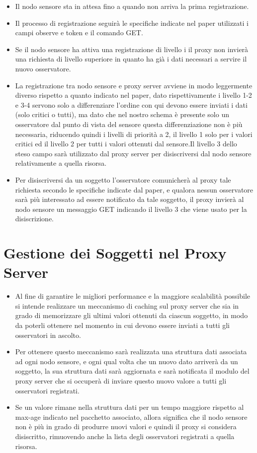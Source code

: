     \begin{itemize}
      \item Il nodo sensore sta in attesa fino a quando non arriva la prima registrazione.
      \item Il processo di registrazione seguirà le specifiche indicate nel paper utilizzati i campi observe e token e il comando GET.
      \item Se il nodo sensore ha attiva una registrazione di livello i il proxy non invierà una richiesta di livello superiore in quanto ha già i dati necessari a servire il nuovo osservatore.
      \item La registrazione tra nodo sensore e proxy server avviene in modo leggermente diverso rispetto a quanto indicato nel paper, dato rispettivamente i livello 1-2 e 3-4 servono solo a differenziare l’ordine con qui devono essere inviati i dati (solo critici o tutti), ma dato che nel nostro schema è presente solo un osservatore dal punto di vista del sensore questa differenziazione non è più necessaria, riducendo quindi i livelli di priorità a 2, il livello 1 solo per i valori critici ed il livello 2 per tutti i valori ottenuti dal sensore.Il livello 3 dello steso campo sarà utilizzato dal proxy server per disiscriversi dal nodo sensore relativamente a quella risorsa.
      \item Per disiscriversi da un soggetto l’osservatore comunicherà al proxy tale richiesta secondo le specifiche indicate dal paper, e qualora nessun osservatore sarà più interessato ad essere notificato da tale soggetto, il proxy invierà  al nodo sensore un messaggio GET indicando il livello 3 che viene usato per la disiscrizione.
    \end{itemize}

  \section{Gestione dei Soggetti nel Proxy Server}

    \begin{itemize}
      \item Al fine di garantire le migliori performance e la maggiore scalabilità possibile si intende realizzare un meccanismo di caching sul proxy server che sia in grado di memorizzare gli ultimi valori ottenuti da ciascun soggetto, in modo da poterli ottenere nel momento in cui devono essere inviati a tutti gli osservatori in ascolto.
      \item Per ottenere questo meccanismo sarà realizzata una struttura dati associata ad ogni nodo sensore, e ogni qual volta che un nuovo dato arriverà da un soggetto, la sua struttura dati sarà aggiornata e sarà notificata il modulo del proxy server che si occuperà di inviare questo nuovo valore a tutti gli osservatori registrati.
      \item Se un valore rimane nella struttura dati per un tempo maggiore rispetto al max-age indicato nel pacchetto associato, allora significa che il nodo sensore non è più in grado di produrre nuovi valori e quindi il proxy si considera disiscritto, rimuovendo anche la lista degli osservatori registrati a quella risorsa.
    \end{itemize}

